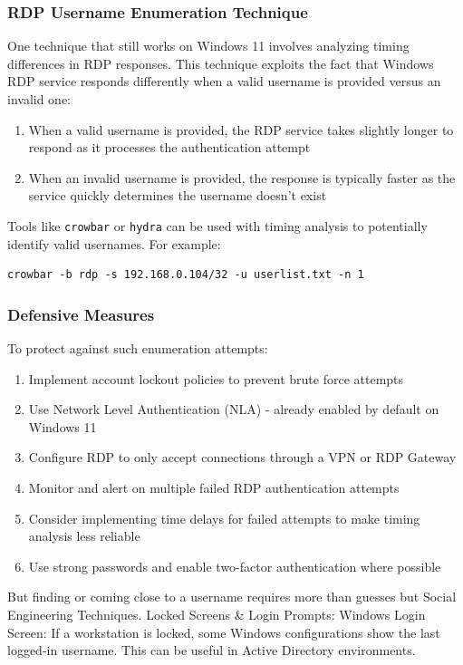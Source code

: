 \documentclass[a4paper,12pt]{article}
\begin{document}
\subsubsection{RDP Username Enumeration Technique}

One technique that still works on Windows 11 involves analyzing timing differences in RDP responses. This technique exploits the fact that Windows RDP service responds differently when a valid username is provided versus an invalid one:

\begin{enumerate}
    \item When a valid username is provided, the RDP service takes slightly longer to respond as it processes the authentication attempt
    \item When an invalid username is provided, the response is typically faster as the service quickly determines the username doesn't exist
\end{enumerate}

Tools like \texttt{crowbar} or \texttt{hydra} can be used with timing analysis to potentially identify valid usernames. For example:

\begin{verbatim}
crowbar -b rdp -s 192.168.0.104/32 -u userlist.txt -n 1
\end{verbatim}

\subsubsection{Defensive Measures}
To protect against such enumeration attempts:

\begin{enumerate}
    \item Implement account lockout policies to prevent brute force attempts
    \item Use Network Level Authentication (NLA) - already enabled by default on Windows 11
    \item Configure RDP to only accept connections through a VPN or RDP Gateway
    \item Monitor and alert on multiple failed RDP authentication attempts
    \item Consider implementing time delays for failed attempts to make timing analysis less reliable
    \item Use strong passwords and enable two-factor authentication where possible
\end{enumerate}
But finding or coming close to a username requires more than guesses but Social Engineering Techniques.
Locked Screens & Login Prompts:
Windows Login Screen: If a workstation is locked, some Windows configurations show the last logged-in username. This can be useful in Active Directory environments.
\end{document}
